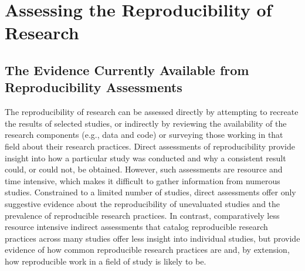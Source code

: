 \section*{Assessing the Reproducibility of Research}

\subsection*{The Evidence Currently Available from Reproducibility Assessments}
The reproducibility of research can be assessed directly by attempting to recreate the results of selected studies, or indirectly by reviewing the availability of the research components (e.g., data and code) or surveying those working in that field about their research practices. 
Direct assessments of reproducibility provide insight into how a particular study was conducted and why a consistent result could, or could not, be obtained.  
However, such assessments are resource and time intensive, which makes it difficult to gather information from numerous studies. 
Constrained to a limited number of studies, direct assessments offer only suggestive evidence about the reproducibility of unevaluated studies and the prevalence of reproducible research practices. 
In contrast, comparatively less resource intensive indirect assessments that catalog reproducible research practices across many studies offer less insight into individual studies, but provide evidence of how common reproducible research practices are and, by extension, how reproducible work in a field of study is likely to be.

